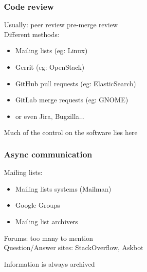\documentclass[17pt,aspectratio=169,hyperref=pdfusetitle]{beamer}
\begin{document}

\begin{frame}
\frametitle{Code review}

Usually: peer review pre-merge review \\

Different methods: 

  \begin{itemize}
  \item Mailing lists (eg: Linux)
  \item Gerrit (eg: OpenStack)
  \item GitHub pull requests (eg: ElasticSearch)
  \item GitLab merge requests (eg: GNOME)
  \item or even Jira, Bugzilla...
  \end{itemize}

  \begin{flushright}
    Much of the control on the software lies here \\
  \end{flushright}
\end{frame}


\begin{frame}
\frametitle{Async communication}

  Mailing lists: \\
  \begin{itemize}
  \item Mailing lists systems (Mailman)
  \item Google Groups
  \item Mailing list archivers
  \end{itemize}

  Forums: too many to mention \\

  Question/Answer sites: StackOverflow, Askbot  \\

  \begin{flushright}
    Information is always archived
  \end{flushright}
\end{frame}

\end{document}
